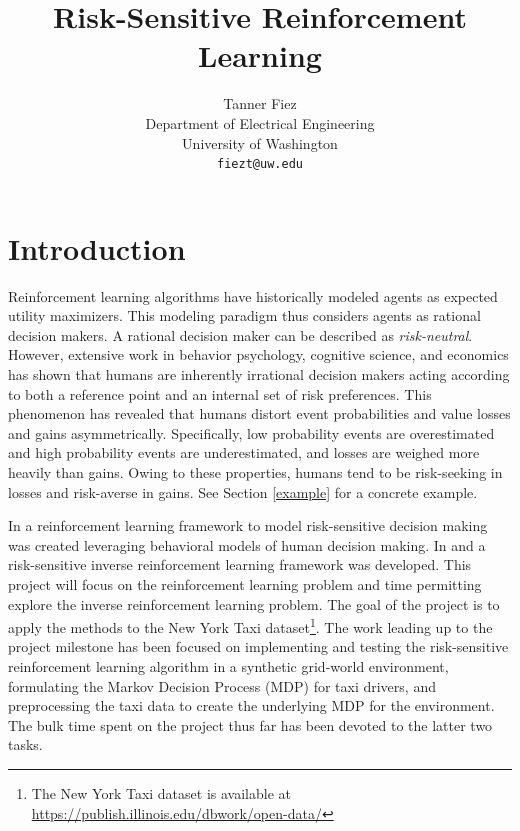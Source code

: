 \documentclass{article}
\title{Risk-Sensitive Reinforcement Learning}
\author{
  Tanner Fiez \\
  Department of Electrical Engineering \\
  University of Washington \\
  \texttt{fiezt@uw.edu} \\
}
\begin{document}
\maketitle

\section{Introduction}
Reinforcement learning algorithms have historically modeled agents as expected utility maximizers. This modeling paradigm thus considers agents as rational decision makers. A rational decision maker can be described as \emph{risk-neutral}. However, extensive work in behavior psychology, cognitive science, and economics has shown that humans are inherently irrational decision makers acting according to both a reference point and an internal set of risk preferences. This phenomenon has revealed that humans distort event probabilities and value losses and gains asymmetrically. Specifically, low probability events are overestimated and high probability events are underestimated, and losses are weighed more heavily than gains. Owing to these properties, humans tend to be risk-seeking in losses and risk-averse in gains. See Section \ref{example} for a concrete example.

In \cite{DBLP:journals/corr/ShenTSO13} a reinforcement learning framework to model risk-sensitive decision making was created leveraging behavioral models of human decision making. In \cite{mazumdar:2017aa} and \cite{ratliff:2017aa} a risk-sensitive inverse reinforcement learning framework was developed. This project will focus on the reinforcement learning problem and time permitting explore the inverse reinforcement learning problem. The goal of the project is to apply the methods to the New York Taxi dataset\footnote{The New York Taxi dataset is available at \url{https://publish.illinois.edu/dbwork/open-data/}}. The work leading up to the project milestone has been focused on implementing and testing the risk-sensitive reinforcement learning algorithm in a synthetic grid-world environment, formulating the Markov Decision Process (MDP) for taxi drivers, and preprocessing the taxi data to create the underlying MDP for the environment. The bulk time spent on the project thus far has been devoted to the latter two tasks.
\end{document}
